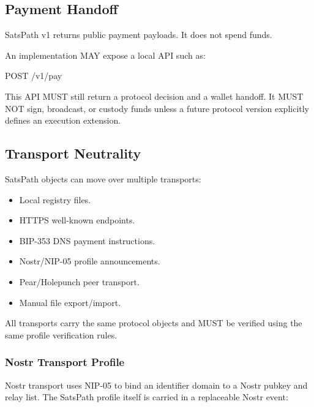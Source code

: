 \documentclass[
]{article}
\newenvironment{Shaded}{}{}
\newcommand{\NormalTok}[1]{#1}
\providecommand{\tightlist}{%
  \setlength{\itemsep}{0pt}\setlength{\parskip}{0pt}}
\begin{document}
\hypertarget{payment-handoff}{%
\subsection{Payment Handoff}\label{payment-handoff}}

SatsPath v1 returns public payment payloads. It does not spend funds.

An implementation MAY expose a local API such as:

\begin{Shaded}
\begin{Highlighting}[]
\NormalTok{POST /v1/pay}
\end{Highlighting}
\end{Shaded}

This API MUST still return a protocol decision and a wallet handoff. It
MUST NOT sign, broadcast, or custody funds unless a future protocol
version explicitly defines an execution extension.

\hypertarget{transport-neutrality}{%
\subsection{Transport Neutrality}\label{transport-neutrality}}

SatsPath objects can move over multiple transports:

\begin{itemize}
\tightlist
\item
  Local registry files.
\item
  HTTPS well-known endpoints.
\item
  BIP-353 DNS payment instructions.
\item
  Nostr/NIP-05 profile announcements.
\item
  Pear/Holepunch peer transport.
\item
  Manual file export/import.
\end{itemize}

All transports carry the same protocol objects and MUST be verified
using the same profile verification rules.

\hypertarget{nostr-transport-profile}{%
\subsubsection{Nostr Transport Profile}\label{nostr-transport-profile}}

Nostr transport uses NIP-05 to bind an identifier domain to a Nostr
pubkey and relay list. The SatsPath profile itself is carried in a
replaceable Nostr event:
\end{document}
